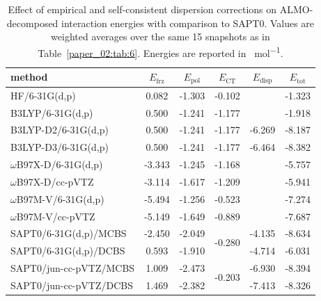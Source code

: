 \documentclass[%
  class = book,%
  crop = false,%
  float = true,%
  multi = true,%
  preview = false,%
]{standalone}
\begin{document}
\begin{table}
  \centering
  \caption[Effect of empirical and self-consistent dispersion corrections in ALMO-EDA]{Effect of empirical and self-consistent dispersion corrections on ALMO-decomposed interaction energies with comparison to SAPT0. Values are weighted averages over the same \num{15} snapshots as in Table~\ref{paper_02:tab:6}. Energies are reported in \si{\kcal\per\mole}.}
  \label{paper_02:tab:S3}
  \begin{tabular}{lccccc}
    \toprule
    method & \(E_{\text{frz}}\) & \(E_{\text{pol}}\) & \(E_{\text{CT}}\) & \(E_{\text{disp}}\) & \(E_{\text{tot}}\) \\
    \midrule
    HF/6-31G(d,p) & 0.082 & -1.303 & -0.102 & \textemdash{} & -1.323 \\
    B3LYP/6-31G(d,p) & 0.500 & -1.241 & -1.177 & \textemdash{} & -1.918 \\
    B3LYP-D2/6-31G(d,p) & 0.500 & -1.241 & -1.177 & -6.269 & -8.187 \\
    B3LYP-D3/6-31G(d,p) & 0.500 & -1.241 & -1.177 & -6.464 & -8.382 \\
    \(\omega\)B97X-D/6-31G(d,p) & -3.343 & -1.245 & -1.168 & \textemdash{} & -5.757 \\
    \(\omega\)B97X-D/cc-pVTZ & -3.114 & -1.617 & -1.209 & \textemdash{} & -5.941 \\
    \(\omega\)B97M-V/6-31G(d,p) & -5.494 & -1.256 & -0.523 & \textemdash{} & -7.274 \\
    \(\omega\)B97M-V/cc-pVTZ & -5.149 & -1.649 & -0.889 & \textemdash{} & -7.687 \\
    SAPT0/6-31G(d,p)/MCBS & -2.450 & -2.049 & \multirow{2}{*}{-0.280} & -4.135 & -8.634 \\
    SAPT0/6-31G(d,p)/DCBS & 0.593 & -1.910 &  & -4.714 & -6.031 \\
    SAPT0/jun-cc-pVTZ/MCBS & 1.009 & -2.473 & \multirow{2}{*}{-0.203} & -6.930 & -8.394 \\
    SAPT0/jun-cc-pVTZ/DCBS & 1.469 & -2.382 & & -7.413 & -8.326 \\
    \bottomrule
  \end{tabular}
\end{table}
\end{document}
